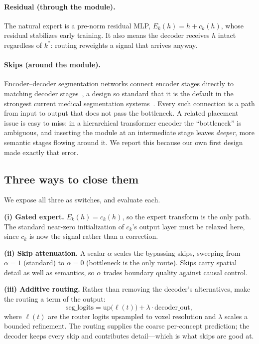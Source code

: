 \paragraph{Residual (through the module).}
The natural expert is a pre-norm residual MLP, $E_k(h)=h+c_k(h)$, whose residual stabilizes early
training. It also means the decoder receives $h$ intact regardless of $k^\ast$: routing reweights
a signal that arrives anyway.

\paragraph{Skips (around the module).}
Encoder--decoder segmentation networks connect encoder stages directly to matching decoder
stages~\cite{ronneberger2015unet}, a design so standard that it is the default in the strongest
current medical segmentation systems~\cite{isensee2021nnunet}.
Every such connection is a path from input to output that does not pass the bottleneck. A related
placement issue is easy to miss: in a hierarchical transformer encoder the ``bottleneck'' is
ambiguous, and inserting the module at an intermediate stage leaves \emph{deeper}, more semantic
stages flowing around it. We report this because our own first design made exactly that error.

\subsection{Three ways to close them}
\label{sec:fixes}
We expose all three as switches, and evaluate each.

\textbf{(i) Gated expert.} $E_k(h)=c_k(h)$, so the expert transform is the only path. The standard
near-zero initialization of $c_k$'s output layer must be relaxed here, since $c_k$ is now the
signal rather than a correction.

\textbf{(ii) Skip attenuation.} A scalar $\alpha$ scales the bypassing skips, sweeping from
$\alpha{=}1$ (standard) to $\alpha{=}0$ (bottleneck is the only route). Skips carry spatial detail
as well as semantics, so $\alpha$ trades boundary quality against causal control.

\textbf{(iii) Additive routing.} Rather than removing the decoder's alternatives, make the routing
a term of the output:
\begin{equation}
\text{seg\_logits}=\mathrm{up}\big(\ell(t)\big) + \lambda\cdot\text{decoder\_out},
\label{eq:direct}
\end{equation}
where $\ell(t)$ are the router logits upsampled to voxel resolution and $\lambda$ scales a bounded
refinement. The routing supplies the coarse per-concept prediction; the decoder keeps every skip
and contributes detail---which is what skips are good at.

